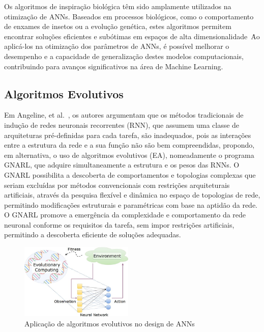 Os algoritmos de inspiração biológica têm sido amplamente utilizados na otimização de ANNs. Baseados em processos biológicos, como o comportamento de enxames de insetos ou a evolução genética, estes algoritmos permitem encontrar soluções eficientes e subótimas em espaços de alta dimensionalidade~\cite{Fister2013AOptimization}\.
Ao aplicá-los na otimização dos parâmetros de ANNs, é possível melhorar o desempenho e a capacidade de generalização destes modelos computacionais, contribuindo para avanços significativos na área de Machine Learning.

\subsection{Algoritmos Evolutivos}\label{subsec:algoritmos-evolutivos}

Em Angeline, et al.~\cite{Angeline1994AnNetworks}, os autores argumentam que os métodos tradicionais de indução de redes neuronais recorrentes (RNN), que assumem uma classe de arquiteturas pré-definidas para cada tarefa, são inadequados, pois as interações entre a estrutura da rede e a sua função não são bem compreendidas, propondo, em alternativa, o uso de algoritmos evolutivos (EA), nomeadamente o programa GNARL, que adquire simultaneamente a estrutura e os pesos das RNNs. O GNARL possibilita a descoberta de comportamentos e topologias complexas que seriam excluídas por métodos convencionais com restrições arquiteturais artificiais, através da pesquisa flexível e dinâmica no espaço de topologias de rede, permitindo modificações estruturais e paramétricas com base na aptidão da rede.
O GNARL promove a emergência da complexidade e comportamento da rede neuronal conforme os requisitos da tarefa, sem impor restrições artificiais, permitindo a descoberta eficiente de soluções adequadas.

\begin{figure}[htbp]
    \centering
    \includegraphics[width=0.48\textwidth]{imagens/evo_alg}
    \caption{Aplicação de algoritmos evolutivos no design de ANNs~\cite{Darwish2020ALearning}}
    \label{fig:evo_alg}
\end{figure}

